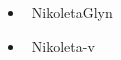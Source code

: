 \documentclass[usenames,dvipsnames,t]{beamer}
\begin{document}
\begin{frame}[fragile]
\begin{columns}
\begin{column}{.2\linewidth}
\begin{block}{}
\begin{multicols}{2}
 \begin{itemize} 
          \item \faTwitter \ NikoletaGlyn 
          \item  \faGithub \ Nikoleta-v 
\end{itemize}
\end{multicols}
\end{block}
\end{column}
\end{columns}

   \vspace{1cm}

\end{frame}
\end{document}
